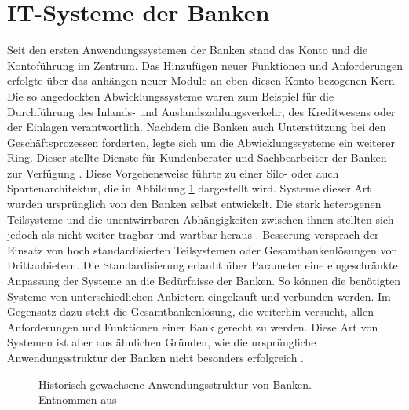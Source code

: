 \documentclass[12pt,oneside,a4paper,parskip]{scrbook}
\begin{document}
\section{IT-Systeme der Banken}
Seit den ersten Anwendungssystemen der Banken stand das Konto und die Kontoführung im Zentrum. Das Hinzufügen neuer Funktionen und Anforderungen erfolgte über das anhängen neuer Module an eben diesen Konto bezogenen Kern. Die so angedockten Abwicklungssysteme waren zum Beispiel für die Durchführung des Inlands- und Auslandszahlungsverkehr, des Kreditwesens oder der Einlagen verantwortlich. Nachdem die Banken auch Unterstützung bei den Geschäftsprozessen forderten, legte sich um die Abwicklungssysteme ein weiterer Ring. Dieser stellte Dienste für Kundenberater und Sachbearbeiter der Banken zur Verfügung \cite[18-20]{ITidF}\cite{SuPdIiB}. Diese Vorgehensweise führte zu einer Silo- oder auch Spartenarchitektur, die in Abbildung \ref{zwiebel} dargestellt wird. Systeme dieser Art wurden ursprünglich von den Banken selbst entwickelt. Die stark heterogenen Teilsysteme und die unentwirrbaren Abhängigkeiten zwischen ihnen stellten sich jedoch als nicht weiter tragbar und wartbar heraus \cite{bankEnzy}\cite{SuPdIiB}\cite[52]{ITidF}. Besserung versprach der Einsatz von hoch standardisierten Teilsystemen oder Gesamtbankenlösungen von Drittanbietern. Die Standardisierung erlaubt über Parameter eine eingeschränkte Anpassung der Systeme an die Bedürfnisse der Banken. So können die benötigten Systeme von unterschiedlichen Anbietern eingekauft und verbunden werden. Im Gegensatz dazu steht die Gesamtbankenlösung, die weiterhin versucht, allen Anforderungen und Funktionen einer Bank gerecht zu werden. Diese Art von Systemen ist aber aus ähnlichen Gründen, wie die ursprüngliche Anwendungsstruktur der Banken nicht besonders erfolgreich \cite[S. 56 ff.]{ITidF}. 

\begin{figure}
  \caption[Historische Anwendungsstruktur von Banken]{Historisch gewachsene Anwendungsstruktur von Banken. Entnommen aus \cite{SuPdIiB}}
  \label{zwiebel}
\end{figure}
\end{document}
